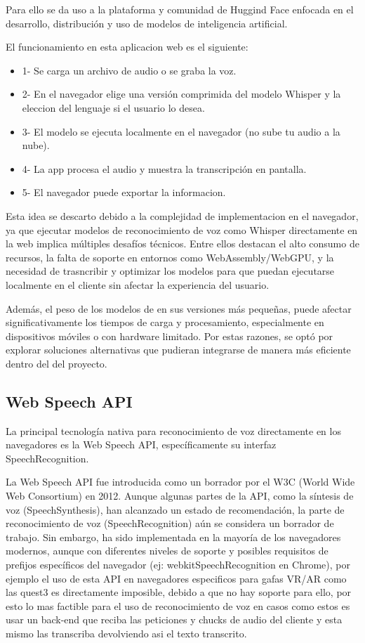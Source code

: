 \documentclass[a4paper, 12pt]{book}
\begin{document}
Para ello se da uso a la plataforma y comunidad de Huggind Face enfocada en el desarrollo, distribución y uso de modelos de inteligencia artificial. 

El funcionamiento en esta aplicacion web es el siguiente: 
\begin{itemize}

    \item 1- Se carga un archivo de audio o se graba la voz.
    \item 2- En el navegador elige una versión comprimida del modelo Whisper y la eleccion del lenguaje si el usuario lo desea.
    \item 3- El modelo se ejecuta localmente en el navegador (no sube tu audio a la nube).
    \item 4- La app procesa el audio y muestra la transcripción en pantalla.
    \item 5- El navegador puede exportar la informacion.
\end{itemize}
Esta idea se descarto debido a la complejidad de implementacion en el navegador, ya que ejecutar modelos de reconocimiento de voz como Whisper directamente en la web implica múltiples desafíos técnicos. Entre ellos destacan el alto consumo de recursos, la falta de soporte en entornos como WebAssembly/WebGPU, y la necesidad de trasncribir y optimizar los modelos para que puedan ejecutarse localmente en el cliente sin afectar la experiencia del usuario.

Además, el peso de los modelos de en sus versiones más pequeñas, puede afectar significativamente los tiempos de carga y procesamiento, especialmente en dispositivos móviles o con hardware limitado. Por estas razones, se optó por explorar soluciones alternativas que pudieran integrarse de manera más eficiente dentro del  del proyecto.


\subsection{Web Speech API}

La principal tecnología nativa para reconocimiento de voz directamente en los navegadores es la Web Speech API, específicamente su interfaz SpeechRecognition.

La Web Speech API fue introducida como un borrador por el W3C (World Wide Web Consortium) en 2012. Aunque algunas partes de la API, como la síntesis de voz (SpeechSynthesis), han alcanzado un estado de recomendación, la parte de reconocimiento de voz (SpeechRecognition) aún se considera un borrador de trabajo. Sin embargo, ha sido implementada en la mayoría de los navegadores modernos, aunque con diferentes niveles de soporte y posibles requisitos de prefijos específicos del navegador (ej: webkitSpeechRecognition en Chrome), por ejemplo el uso de esta API en navegadores especificos para gafas VR/AR como las quest3 es directamente imposible, debido a que no hay soporte para ello, por esto lo mas factible para el uso de reconocimiento de voz en casos como estos es usar un back-end que reciba las peticiones y chucks de audio del cliente y esta mismo las transcriba devolviendo asi el texto transcrito.
\end{document}
